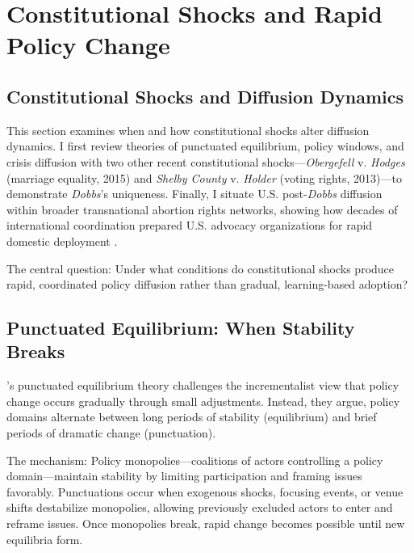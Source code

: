 \section{Constitutional Shocks and Rapid Policy Change}
\label{sec:shocks}

\subsection{Constitutional Shocks and Diffusion Dynamics}

This section examines when and how constitutional shocks alter diffusion dynamics. I first review theories of punctuated equilibrium, policy windows, and crisis diffusion \parencite{baumgartner_jones_1993, kingdonAgendasAlternativesPublic2011a, bousheyPolicyDiffusionDynamics2010a, schiffTrumpingCentersDisease2023a} with two other recent constitutional shocks---\emph{Obergefell} v. \emph{Hodges} (marriage equality, 2015) and \emph{Shelby County} v. \emph{Holder} (voting rights, 2013)---to demonstrate \emph{Dobbs}'s uniqueness. Finally, I situate U.S. post-\emph{Dobbs} diffusion within broader transnational abortion rights networks, showing how decades of international coordination prepared U.S. advocacy organizations for rapid domestic deployment \parencite{fernandezandersonDiffusingStrategiesNorthSouth2025}.

The central question: Under what conditions do constitutional shocks produce rapid, coordinated policy diffusion rather than gradual, learning-based adoption?



\subsection{Punctuated Equilibrium: When Stability Breaks}

\textcite{baumgartner_jones_1993}'s punctuated equilibrium theory challenges the incrementalist view that policy change occurs gradually through small adjustments. Instead, they argue, policy domains alternate between long periods of stability (equilibrium) and brief periods of dramatic change (punctuation).

The mechanism: Policy monopolies---coalitions of actors controlling a policy domain---maintain stability by limiting participation and framing issues favorably. Punctuations occur when exogenous shocks, focusing events, or venue shifts destabilize monopolies, allowing previously excluded actors to enter and reframe issues. Once monopolies break, rapid change becomes possible until new equilibria form.

